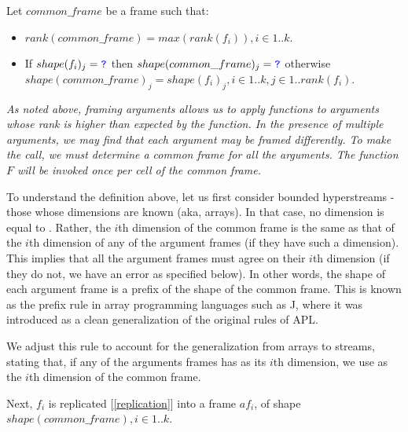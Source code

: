 \documentclass{article}
\begin{document}
Let $common\_frame$ be a frame such that:
\begin{itemize}
\item  $rank(common\_frame) = max(rank(f_i)), i \in 1 ..k$. 
\item  If $shape(f_i)_j = \texttt{\color{blue} ?}{}$ then $shape(common\_frame)_j = \texttt{\color{blue} ?}{}$ otherwise $shape(common\_frame)_j =  shape(f_i)_j,i \in 1 ..k, j \in 1..rank(f_i)$.
\end{itemize}

{\em
As noted above, framing arguments allows us to apply functions to arguments whose rank is higher than expected by the function. In the presence of multiple arguments,
we may find that each argument may be framed differently. To make the call, we must determine a common frame for all the arguments. The function $F$ will be 
invoked once per cell of the common frame.  

To understand the definition above, let us first consider bounded hyperstreams - those whose dimensions are known (aka, arrays).
In that case, no dimension is equal to \QUESTIONMARK{}. Rather, the $i$th dimension of the common frame is the same as that of the $i$th dimension of any of the argument frames (if they have such a dimension).  This implies that all the argument frames must agree on their $i$th dimension (if they do not, we have an error as specified below).
In other words, the shape of each argument frame is a prefix of the shape of the common frame. This is known as the prefix rule in array programming languages such as J,  where it was introduced as a clean generalization of the original rules of APL.

We adjust this rule to account for the generalization from arrays to streams, 
stating that, if any of the arguments frames has \QUESTIONMARK{} as its $i$th dimension, we use \QUESTIONMARK{} as the $i$th dimension of the common frame.
}

Next, $f_i$ is replicated [\ref{replication}] into a frame $af_i$, of shape $shape(common\_frame), i \in 1..k$. 
\end{document}

